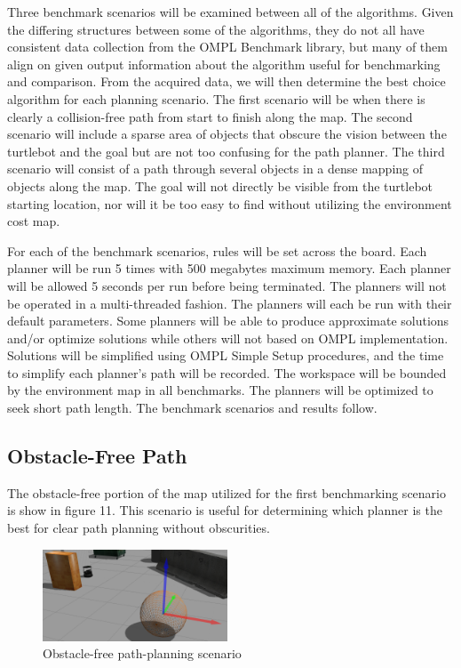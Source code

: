 \documentclass[conference]{IEEEtran} \usepackage[T1]{fontenc} \usepackage[backend=biber, style=ieee]{biblatex}
\begin{document}
Three benchmark scenarios will be examined between all of the algorithms. Given the differing structures between some of the algorithms, they do not all
have consistent data collection from the OMPL Benchmark library, but many of them align on given output information about the algorithm useful for benchmarking
and comparison. From the acquired data, we will then determine the best choice algorithm for each planning scenario. The first scenario will be when there is clearly a 
collision-free path from start to finish along the map. The second scenario will include a sparse area of objects that obscure the vision between the turtlebot and 
the goal but are not too confusing for the path planner. The third scenario will consist of a path through several objects in a dense mapping of objects along the map. 
The goal will not directly be visible from the turtlebot starting location, nor will it be too easy to find without utilizing the environment cost map.

For each of the benchmark scenarios, rules will be set across the board. Each planner will be run 5 times with 500 megabytes maximum memory. Each planner will be allowed 5 
seconds per run before being terminated. The planners will not be operated in a multi-threaded fashion. The planners will each be run with their default parameters. Some 
planners will be able to produce approximate solutions and/or optimize solutions while others will not based on OMPL implementation. Solutions will be simplified using OMPL 
Simple Setup procedures, and the time to simplify each planner's path will be recorded. The workspace will be bounded by the environment map in all benchmarks. The planners 
will be optimized to seek short path length. The benchmark scenarios and results follow.

\subsection{Obstacle-Free Path} \label{Obstacle-free Path}

The obstacle-free portion of the map utilized for the first benchmarking scenario is show in figure 11. This scenario is useful for determining which planner is the
best for clear path planning without obscurities.

\begin{figure}
\label{figure11} 
\centering 
\includegraphics[width=0.49\textwidth]{scenario_1}
\caption{Obstacle-free path-planning scenario}
\end{figure}
\end{document}
